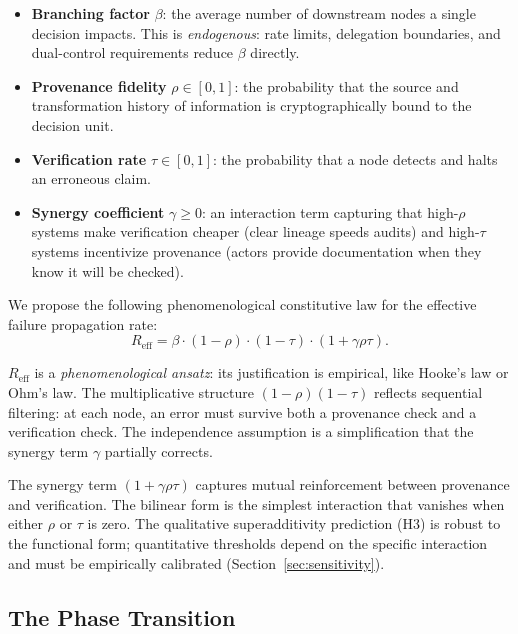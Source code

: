 \documentclass[runningheads]{llncs}
\begin{document}
\begin{itemize}
\item \textbf{Branching factor} $\beta$: the average number of downstream nodes a single decision impacts. This is \emph{endogenous}: rate limits, delegation boundaries, and dual-control requirements reduce $\beta$ directly.
\item \textbf{Provenance fidelity} $\rho \in [0,1]$: the probability that the source and transformation history of information is cryptographically bound to the decision unit.
\item \textbf{Verification rate} $\tau \in [0,1]$: the probability that a node detects and halts an erroneous claim.
\item \textbf{Synergy coefficient} $\gamma \geq 0$: an interaction term capturing that high-$\rho$ systems make verification cheaper (clear lineage speeds audits) and high-$\tau$ systems incentivize provenance (actors provide documentation when they know it will be checked).
\end{itemize}

We propose the following phenomenological constitutive law for the effective failure propagation rate:
\begin{equation}
R_{\mathrm{eff}} = \beta \cdot (1-\rho) \cdot (1-\tau) \cdot (1+\gamma \rho \tau).
\label{eq:reff}
\end{equation}

$R_{\mathrm{eff}}$ is a \emph{phenomenological ansatz}: its justification is empirical, like Hooke's law or Ohm's law. The multiplicative structure $(1-\rho)(1-\tau)$ reflects sequential filtering: at each node, an error must survive both a provenance check and a verification check. The independence assumption is a simplification that the synergy term $\gamma$ partially corrects.

The synergy term $(1+\gamma\rho\tau)$ captures mutual reinforcement between provenance and verification. The bilinear form is the simplest interaction that vanishes when either $\rho$ or $\tau$ is zero. The qualitative superadditivity prediction (H3) is robust to the functional form; quantitative thresholds depend on the specific interaction and must be empirically calibrated (Section~\ref{sec:sensitivity}).

\subsection{The Phase Transition}
\end{document}

